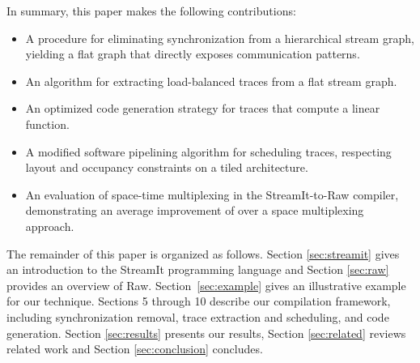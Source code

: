 In summary, this paper makes the following contributions:

\begin{itemize}
\item A procedure for eliminating synchronization from a hierarchical
stream graph, yielding a flat graph that directly exposes
communication patterns.
\item An algorithm for extracting load-balanced traces from a flat
stream graph.
\item An optimized code generation strategy for traces that compute a
linear function.
\item A modified software pipelining algorithm for scheduling traces,
respecting layout and occupancy constraints on a tiled architecture.
\item An evaluation of space-time multiplexing in the StreamIt-to-Raw
compiler, demonstrating an average improvement of  over a
space multiplexing approach.
\end{itemize}

The remainder of this paper is organized as follows.  Section
\ref{sec:streamit} gives an introduction to the StreamIt programming
language and Section \ref{sec:raw} provides an overview of
Raw. Section~\ref{sec:example} gives an illustrative example for our
technique.  Sections 5 through 10 describe our compilation framework,
including synchronization removal, trace extraction and scheduling,
and code generation.  Section \ref{sec:results} presents our results,
Section \ref{sec:related} reviews related work and Section
\ref{sec:conclusion} concludes.


